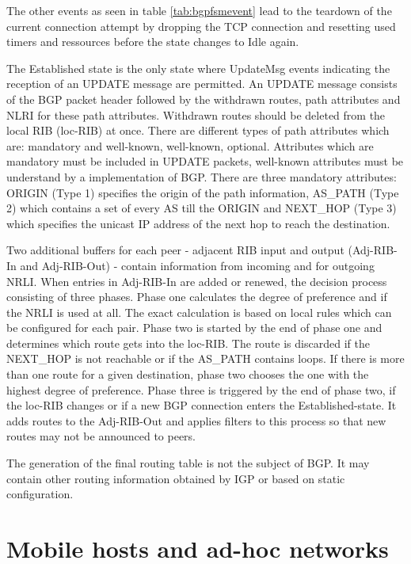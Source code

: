 \documentclass{acm_proc_article-sp}
\begin{document}
The other events as seen in table \ref{tab:bgpfsmevent} lead to the teardown of the current connection attempt by dropping the TCP connection and resetting used timers and ressources before the state changes to Idle again.

The Established state is the only state where UpdateMsg events indicating the reception of an UPDATE message are permitted. An UPDATE message consists of the BGP packet header followed by the withdrawn routes, path attributes and NLRI for these path attributes. Withdrawn routes should be deleted from the local RIB (loc-RIB) at once. There are different types of path attributes which are: mandatory and well-known, well-known, optional. Attributes which are mandatory must be included in UPDATE packets, well-known attributes must be understand by a implementation of BGP. There are three mandatory attributes: ORIGIN (Type 1) specifies the origin of the path information, AS\_PATH (Type 2) which contains a set of every AS till the ORIGIN and NEXT\_HOP (Type 3) which specifies the unicast IP address of the next hop to reach the destination.

Two additional buffers for each peer - adjacent RIB input and output (Adj-RIB-In and Adj-RIB-Out) - contain information from incoming and for outgoing NRLI. When entries in Adj-RIB-In are added or renewed, the decision process consisting of three phases. Phase one calculates the degree of preference and if the NRLI is used at all. The exact calculation is based on local rules which can be configured for each pair. Phase two is started by the end of phase one and determines which route gets into the loc-RIB. The route is discarded if the NEXT\_HOP is not reachable or if the AS\_PATH contains loops. If there is more than one route for a given destination, phase two chooses the one with the highest degree of preference. Phase three is triggered by the end of phase two, if the loc-RIB changes or if a new BGP connection enters the Established-state. It adds routes to the Adj-RIB-Out and applies filters to this process so that new routes may not be announced to peers.

The generation of the final routing table is not the subject of BGP. It may contain other routing information obtained by IGP or based on static configuration.

\section{Mobile hosts and ad-hoc networks}
\end{document}
